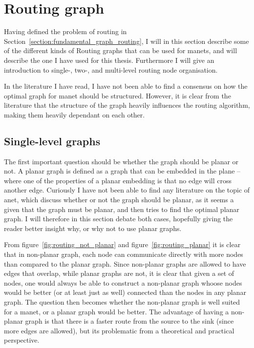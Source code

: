 \section{Routing graph}
\label{section:routing_graph}

Having defined the problem of routing in Section~\ref{section:fundamental_graph_routing}, I will in this section describe some of the different kinds of Routing graphs that can be used for \acp{manet}, and will describe the one I have used for this thesis. Furthermore I will give an introduction to single-, two-, and multi-level routing node organisation. 

In the literature I have read, I have not been able to find a consensus on how the optimal graph for \ac{manet} should be structured. However, it is clear from the literature that the structure of the graph heavily influences the routing algorithm, making them heavily dependant on each other. 

\subsection{Single-level graphs}
\label{single_level}
The first important question should be whether the graph should be planar or not. A planar graph is defined as a graph that can be embedded in the plane -- where one of the properties of a planar embedding is that no edge will cross another edge.
Curiously I have not been able to find any literature on the topic of \ac{anet}, which discuss whether or not the graph should be planar, as it seems a given that the graph must be planar, and then tries to find the optimal planar graph. I will therefore in this section debate both cases, hopefully giving the reader better insight why, or why not to use planar graphs.

From figure~\ref{fig:routing_not_planar} and figure~\ref{fig:routing_planar} it is clear that in non-planar graph, each node can communicate directly with more nodes than compared to the planar graph. Since non-planar graphs are allowed to have edges that overlap, while planar graphs are not, it is clear that given a set of nodes, one would always be able to construct a non-planar graph whoose nodes would be better (or at least just as well) connected than the nodes in any planar graph. The question then becomes whether the non-planar graph is well suited for a \ac{manet}, or a planar graph would be better. The advantage of having a non-planar graph is that there is a faster route from the source to the sink (since more edges are allowed), but its problematic from a theoretical and practical perspective.

